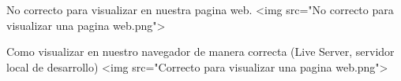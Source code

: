 No correcto para visualizar en nuestra pagina web.
<img src="No correcto para visualizar una pagina web.png">

Como visualizar en nuestro navegador de manera correcta (Live Server, servidor local de desarrollo)
<img src="Correcto para visualizar una pagina web.png">
